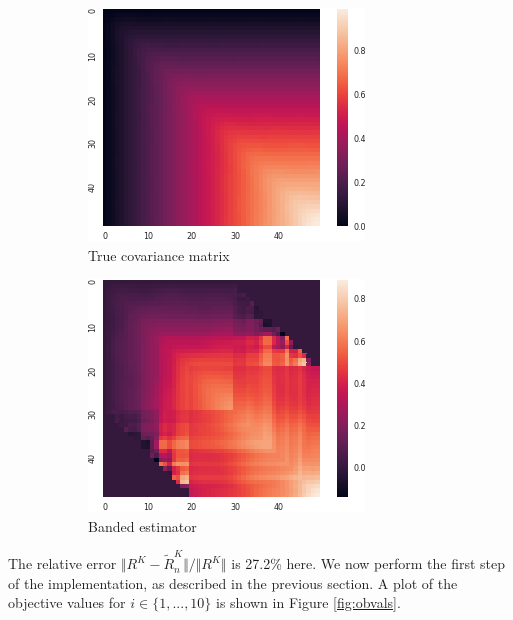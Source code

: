 \documentclass[10pt, a4paper]{report}
\theoremstyle{definition}
\theoremstyle{remark}
\begin{document}
\begin{figure}[H]
	\centering
	\begin{subfigure}{.5\textwidth}
		\centering
		\includegraphics[width=.8\linewidth]{Code/images/24/truecov}
		\caption{True covariance matrix}
	\end{subfigure}%
	\begin{subfigure}{.5\textwidth}
		\centering
		\includegraphics[width=.8\linewidth]{Code/images/24/trunccov}
		\caption{Banded estimator}
	\end{subfigure}
	\caption{}
	\label{fig:truetrunccov}
\end{figure}
The relative error $\Vert R^K - \tilde{R}_n^K\Vert / \Vert R^K \Vert$ is 27.2\% here. We now perform the first step of the implementation, as described in the previous section. A plot of the objective values for $i \in \{1,...,10\}$ is shown in Figure \ref{fig:obvals}.
\end{document}
